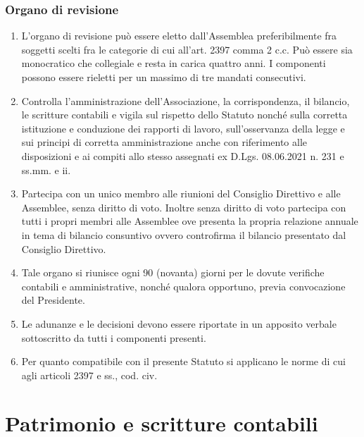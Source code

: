 \documentclass{djtsdoc}
\begin{document}
	\section{Organo di revisione}
	\begin{enumerate}
			\item L'organo di revisione può essere eletto dall'Assemblea preferibilmente fra soggetti scelti fra le categorie di cui all'art. 2397 comma 2 c.c. Può essere sia monocratico che collegiale e resta in carica quattro   anni. I componenti possono essere rieletti per un massimo di tre mandati consecutivi.
			\item Controlla l'amministrazione dell'Associazione, la corrispondenza, il bilancio, le scritture contabili e vigila sul rispetto dello Statuto nonché sulla corretta istituzione   e conduzione dei rapporti di lavoro, sull'osservanza della legge e  sui principi di corretta amministrazione  anche con riferimento alle disposizioni e ai compiti allo stesso assegnati ex D.Lgs. 08.06.2021 n. 231 e ss.mm. e ii.
			\item Partecipa con un unico membro alle riunioni del Consiglio Direttivo e alle Assemblee, senza diritto di voto. Inoltre senza diritto di voto partecipa con tutti i propri membri alle Assemblee ove presenta la propria relazione annuale in tema di bilancio consuntivo ovvero controfirma il bilancio presentato dal Consiglio Direttivo.
			\item Tale organo si riunisce ogni 90 (novanta) giorni per le dovute verifiche contabili e amministrative, nonché qualora opportuno, previa convocazione del Presidente.
			\item Le adunanze e le decisioni devono essere riportate in un apposito verbale sottoscritto da tutti i componenti presenti.
			\item Per quanto compatibile con il presente Statuto si applicano le norme di cui agli articoli 2397 e ss., cod. civ.
	\end{enumerate}
	
	\part{Patrimonio e scritture contabili}
\end{document}
